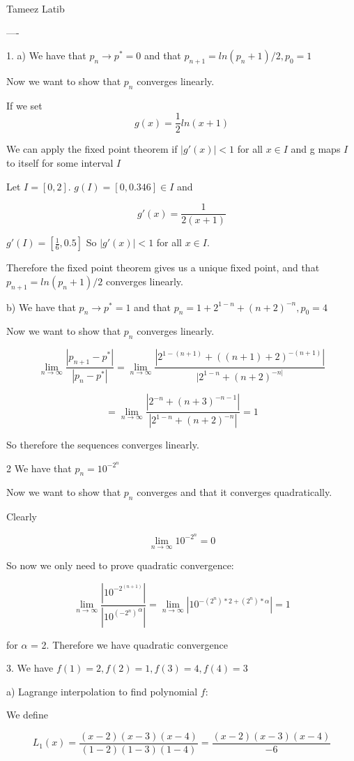 \documentclass{article}
\begin{document}
Tameez Latib


----

1.
a)  We have that $p_n \rightarrow p^* = 0$ and that $p_{n+1} = ln(p_n +  1)/2, p_0 = 1$

Now we want to show that $p_n$ converges linearly.

If we set $$g(x) = \frac{1}{2} ln(x+1)$$

We can apply the fixed point theorem if $|g'(x)| < 1$ for all $x \in I$ and g maps $I$ to itself for some interval $I$

Let $I = [0, 2]$. $g(I) = [0, 0.346] \in I$ and 

$$g'(x) = \frac{1}{2(x+1)} $$

$g'(I) = [\frac{1}{6}, 0.5]$ So $|g'(x)| < 1$ for all $x \in I$. 

Therefore the fixed point theorem gives us a unique fixed point, and that $p_{n+1} = ln(p_n +  1)/2$ converges linearly. 

b) We have that $p_n \rightarrow p^* = 1$ and that $p_{n} =1 + 2^{1-n} + (n+2)^{-n}, p_0 = 4$

Now we want to show that $p_n$ converges linearly.


$$\lim_{n \to \infty} \frac{|p_{n+1}-p^*|}{|p_{n}-p^*|} = \lim_{n \to \infty} \frac{|2^{1-(n+1)} + ((n+1)+2)^{-(n+1)}|}{|2^{1-n} + (n+2)^{-n|}}$$

$$= \lim_{n \to \infty} \frac{|2^{-n} + (n+3)^{-n-1}|}{|2^{1-n} + (n+2)^{-n}|} = 1 $$

So therefore the sequences converges linearly.


2
We have that $p_{n} = 10^{-2^n}$

Now we want to show that $p_n$ converges and that it converges quadratically.

Clearly 

$$ \lim_{n \to \infty} 10^{-2^n} = 0 $$

 So now we only need to prove quadratic convergence: 

$$\lim_{n \to \infty} \frac{|10^{-2^(n+1)}|}{|{10^{(-2^n)}}^{\alpha}|} = \lim_{n \to \infty} |10^{-(2^n)*2+(2^n)*\alpha}| = 1$$

for $\alpha$ = 2. Therefore we have quadratic convergence

3. We have $f(1) = 2, f(2) = 1, f(3) = 4, f(4) = 3$ 

a)
Lagrange interpolation to find polynomial $f$:

We define 

$$L_1(x) = \frac{(x-2)(x-3)(x-4)}{(1-2)(1-3)(1-4)} =  \frac{(x-2)(x-3)(x-4)}{-6} $$
\end{document}
